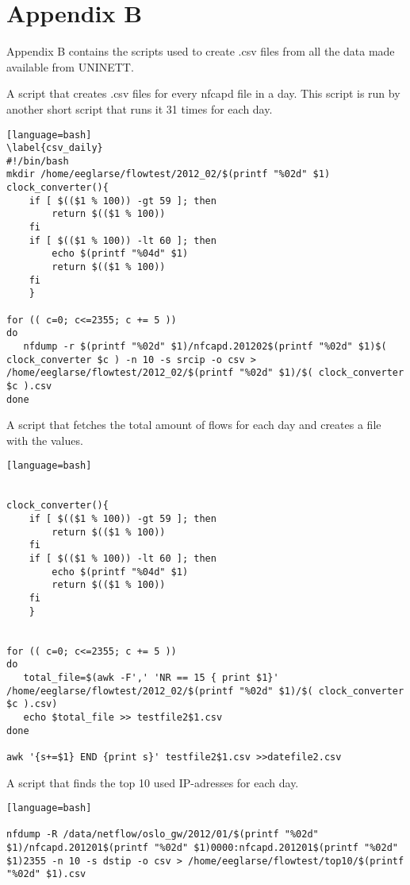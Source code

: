 \chapter{Appendix B}
\label{chp:appendixb} 
Appendix B contains the scripts used to create .csv files from all the data made available from UNINETT.

A script that creates .csv files for every nfcapd file in a day. This script is run by another short script that runs it 31 times for each day.
\begin{lstlisting}[caption={Creates .csv files for every nfcapd file in a day}][language=bash]
\label{csv_daily}
#!/bin/bash
mkdir /home/eeglarse/flowtest/2012_02/$(printf "%02d" $1)
clock_converter(){
	if [ $(($1 % 100)) -gt 59 ]; then
		return $(($1 % 100))
	fi
	if [ $(($1 % 100)) -lt 60 ]; then
		echo $(printf "%04d" $1)
		return $(($1 % 100))
	fi
	}

for (( c=0; c<=2355; c += 5 ))
do
   nfdump -r $(printf "%02d" $1)/nfcapd.201202$(printf "%02d" $1)$( clock_converter $c ) -n 10 -s srcip -o csv > /home/eeglarse/flowtest/2012_02/$(printf "%02d" $1)/$( clock_converter $c ).csv
done
\end{lstlisting}

A script that fetches the total amount of flows for each day and creates a file with the values.
\begin{lstlisting}[caption={Total amount of flows for each day}][language=bash]


clock_converter(){
	if [ $(($1 % 100)) -gt 59 ]; then
		return $(($1 % 100))
	fi
	if [ $(($1 % 100)) -lt 60 ]; then
		echo $(printf "%04d" $1)
		return $(($1 % 100))
	fi
	}


for (( c=0; c<=2355; c += 5 ))
do
   total_file=$(awk -F',' 'NR == 15 { print $1}' /home/eeglarse/flowtest/2012_02/$(printf "%02d" $1)/$( clock_converter $c ).csv)
   echo $total_file >> testfile2$1.csv
done

awk '{s+=$1} END {print s}' testfile2$1.csv >>datefile2.csv

\end{lstlisting}
A script that finds the top 10 used IP-adresses for each day. 
\begin{lstlisting}[caption={Top 10 used IP-adresses for each day}][language=bash]

nfdump -R /data/netflow/oslo_gw/2012/01/$(printf "%02d" $1)/nfcapd.201201$(printf "%02d" $1)0000:nfcapd.201201$(printf "%02d" $1)2355 -n 10 -s dstip -o csv > /home/eeglarse/flowtest/top10/$(printf "%02d" $1).csv
\end{lstlisting}

